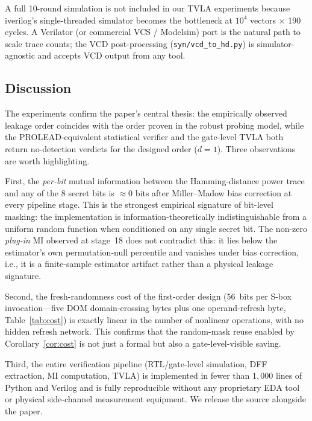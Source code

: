 \documentclass[lettersize,journal]{IEEEtran}
\begin{document}
A full 10-round simulation is not included in our TVLA
experiments because iverilog's single-threaded simulator becomes
the bottleneck at $10^4$ vectors $\times$ 190 cycles.  A
Verilator (or commercial VCS / Modelsim) port is the natural
path to scale trace counts; the VCD post-processing
(\texttt{syn/vcd\_to\_hd.py}) is simulator-agnostic and accepts
VCD output from any tool.

\subsection{Discussion}
The experiments confirm the paper's central thesis: the empirically
observed leakage order coincides with the order proven in the robust
probing model, while the PROLEAD-equivalent statistical verifier and
the gate-level TVLA both return no-detection verdicts for the
designed order ($d{=}1$).  Three observations are worth
highlighting.

First, the \emph{per-bit} mutual information between the Hamming-distance
power trace and any of the 8 secret bits is $\approx 0$ bits after
Miller--Madow bias correction at every pipeline stage.  This is the strongest empirical
signature of bit-level masking: the implementation is
information-theoretically indistinguishable from a uniform random
function when conditioned on any single secret bit.  The non-zero
\emph{plug-in} MI observed at stage~18 does not contradict this: it
lies below the estimator's own permutation-null percentile and
vanishes under bias correction, i.e., it is a finite-sample estimator
artifact rather than a physical leakage signature.

Second, the fresh-randomness cost of the first-order design
($56$~bits per S-box invocation---five DOM domain-crossing bytes plus
one operand-refresh byte, Table~\ref{tab:cost}) is exactly linear in
the number of nonlinear operations, with no hidden refresh network.
This confirms that the random-mask reuse enabled by
Corollary~\ref{cor:cost} is not just a formal but also a
gate-level-visible saving.

Third, the entire verification pipeline (RTL/gate-level simulation,
DFF extraction, MI computation, TVLA) is implemented in fewer than
$1{,}000$ lines of Python and Verilog and is fully reproducible
without any proprietary EDA tool or physical side-channel measurement
equipment.  We release the source alongside the paper.
\end{document}
